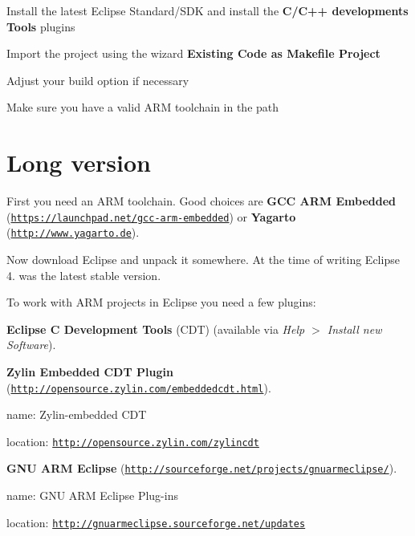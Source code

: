 Install the latest Eclipse Standard/\+S\+D\+K and install the {\bfseries C/\+C++ developments Tools} plugins 

Import the project using the wizard {\bfseries Existing Code as Makefile Project} 

Adjust your build option if necessary 

Make sure you have a valid A\+R\+M toolchain in the path 

\section*{Long version}


\begin{DoxyItemize}
\item First you need an A\+R\+M toolchain. Good choices are {\bfseries G\+C\+C A\+R\+M Embedded} (\href{https://launchpad.net/gcc-arm-embedded}{\tt https\+://launchpad.\+net/gcc-\/arm-\/embedded}) or {\bfseries Yagarto} (\href{http://www.yagarto.de}{\tt http\+://www.\+yagarto.\+de}).
\item Now download Eclipse and unpack it somewhere. At the time of writing Eclipse 4. was the latest stable version.
\item To work with A\+R\+M projects in Eclipse you need a few plugins\+:
\begin{DoxyItemize}
\item {\bfseries Eclipse C Development Tools} (C\+D\+T) (available via {\itshape Help $>$ Install new Software}).
\item {\bfseries Zylin Embedded C\+D\+T Plugin} (\href{http://opensource.zylin.com/embeddedcdt.html}{\tt http\+://opensource.\+zylin.\+com/embeddedcdt.\+html}).
\begin{DoxyItemize}
\item name\+: Zylin-\/embedded C\+D\+T
\item location\+: \href{http://opensource.zylin.com/zylincdt}{\tt http\+://opensource.\+zylin.\+com/zylincdt}
\end{DoxyItemize}
\item {\bfseries G\+N\+U A\+R\+M Eclipse} (\href{http://sourceforge.net/projects/gnuarmeclipse/}{\tt http\+://sourceforge.\+net/projects/gnuarmeclipse/}).
\begin{DoxyItemize}
\item name\+: G\+N\+U A\+R\+M Eclipse Plug-\/ins
\item location\+: \href{http://gnuarmeclipse.sourceforge.net/updates}{\tt http\+://gnuarmeclipse.\+sourceforge.\+net/updates}

\end{DoxyItemize}
\end{DoxyItemize}
\end{DoxyItemize}
